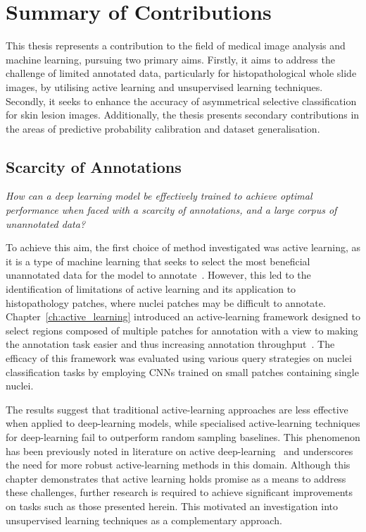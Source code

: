 \section{Summary of Contributions}
This thesis represents a contribution to the field of medical image analysis and machine learning, pursuing two primary aims. Firstly, it aims to address the challenge of limited annotated data, particularly for histopathological whole slide images, by utilising active learning and unsupervised learning techniques. Secondly, it seeks to enhance the accuracy of asymmetrical selective classification for skin lesion images. Additionally, the thesis presents secondary contributions in the areas of predictive probability calibration and dataset generalisation.

\subsection{Scarcity of Annotations}
\textit{How can a deep learning model be effectively trained to achieve optimal performance when faced with a scarcity of annotations, and a large corpus of unannotated data?}

To achieve this aim, the first choice of method investigated was active learning, as it is a type of machine learning that seeks to select the most beneficial unannotated data for the model to annotate~\citep{settles2009active}. However, this led to the identification of limitations of active learning and its application to histopathology patches, where nuclei patches may be difficult to annotate. Chapter~\ref{ch:active_learning} introduced an active-learning framework designed to select regions composed of multiple patches for annotation with a view to making the annotation task easier and thus increasing annotation throughput~\citep{carse2019active}. The efficacy of this framework was evaluated using various query strategies on nuclei classification tasks by employing CNNs trained on small patches containing single nuclei. 

The results suggest that traditional active-learning approaches are less effective when applied to deep-learning models, while specialised active-learning techniques for deep-learning fail to outperform random sampling baselines. This phenomenon has been previously noted in literature on active deep-learning~\citep{ren2021survey} and underscores the need for more robust active-learning methods in this domain. Although this chapter demonstrates that active learning holds promise as a means to address these challenges, further research is required to achieve significant improvements on tasks such as those presented herein. This motivated an investigation into unsupervised learning techniques as a complementary approach.

